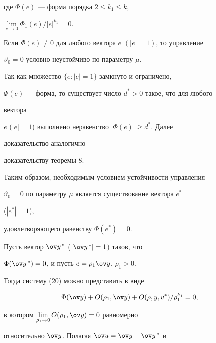 где $\Phi(e)$ --- форма порядка $2\le k_1\le k$, 


$\lim\limits_{e\to0}\Phi_1(e)/|e|^{k_1}=0$. 


 


\begin{thm} 


Если $\Phi(e)\ne0$ для любого вектора $e$ $(|e|=1)$, то управление 


$\vartheta_0=0$ условно неустойчиво по параметру $\mu$. 


\end{thm} 


 


\begin{pf} 


Так как множество $\{e:|e|=1\}$ замкнуто и ограничено, 


$\Phi(e)$ --- форма, то существует число $d^*>0$ такое, что для любого 


вектора 


$e$ ($|e|=1$) выполнено неравенство $|\Phi(e)|\ge d^*$. Далее 


доказательство аналогично 


доказательству теоремы 8. 


\end{pf} 


 


Таким образом, необходимым условием устойчивости управления 


$\vartheta_0=0$ по параметру $\mu$ является существование вектора $e^*$ 


($|e^*|=1$), 


удовлетворяющего равенству $\Phi(e^*)=0$. 


 


Пусть вектор $\ov y^{\,*}$ ($|\ov y^{\,*}|=1$) таков, что 


$\Phi(\ov y^{\,*})=0$, и пусть $e=\rho_1\ov y$, $\rho_1>0$. 


Тогда систему (20) можно представить в виде 


$$ 


\Phi(\ov y)+O(\rho_1,\ov y)+O(\rho,y,v^*)/\rho^{k_1}_1=0, 


$$ 


в котором $\lim\limits_{\rho_1\to0}O(\rho_1,\ov y)=0$ равномерно 


относительно $\ov y$. Полагая $\ov u=\ov y-\ov y^{\,*}$ и 


